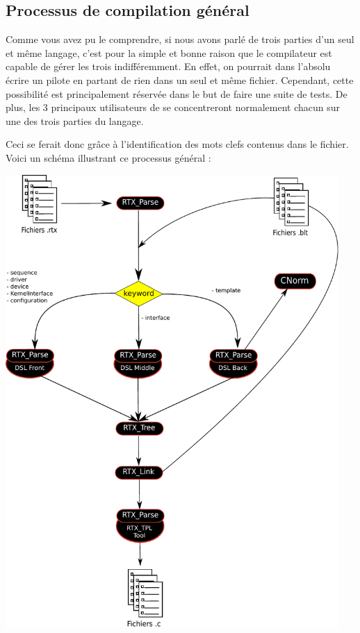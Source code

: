 \documentclass[french]{rtxreport}
\begin{document}
\subsection{Processus de compilation général}

Comme vous avez pu le comprendre, si nous avons parlé de trois parties d'un
seul et même langage, c'est pour la simple et bonne raison que le compilateur
est capable de gérer les trois indifféremment. En effet, on pourrait dans
l'absolu écrire un pilote en partant de rien dans un seul et même fichier.
Cependant, cette possibilité est principalement réservée dans le but de faire
une suite de tests. De plus, les 3 principaux utilisateurs de \rtx se
concentreront normalement chacun sur une des trois parties du langage.

Ceci se ferait donc grâce à l'identification des mots clefs contenus dans le
fichier. Voici un schéma illustrant ce processus général :

\includegraphics[width=0.95\textwidth]{logigramme.pdf}
\end{document}
